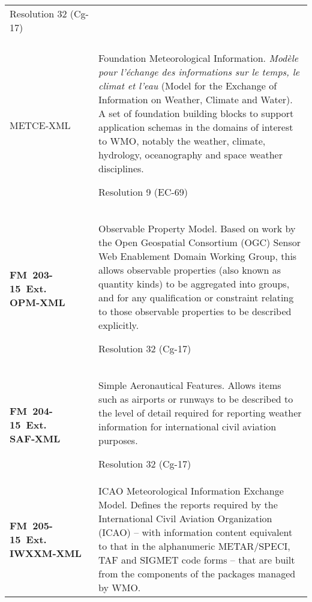 \begin{longtable}[]{@{}ll@{}}
\begin{minipage}[t]{0.47\columnwidth}
Resolution 32 (Cg-17)\strut
\end{minipage}\tabularnewline
\begin{minipage}[t]{0.47\columnwidth}\raggedright
\textbf{FM~202-16\\
METCE‑XML}\strut
\end{minipage} & \begin{minipage}[t]{0.47\columnwidth}\raggedright
Foundation Meteorological Information. \emph{Modèle pour l'échange des informations sur le temps, le climat et l'eau} (Model for the Exchange of Information on Weather, Climate and Water). A set of foundation building blocks to support application schemas in the domains of interest to WMO, notably the weather, climate, hydrology, oceanography and space weather disciplines.

Resolution 9 (EC-69)\strut
\end{minipage}\tabularnewline
\begin{minipage}[t]{0.47\columnwidth}\raggedright
\textbf{FM~203-15~Ext. OPM‑XML}\strut
\end{minipage} & \begin{minipage}[t]{0.47\columnwidth}\raggedright
Observable Property Model. Based on work by the Open Geospatial Consortium (OGC) Sensor Web Enablement Domain Working Group, this allows observable properties (also known as quantity kinds) to be aggregated into groups, and for any qualification or constraint relating to those observable properties to be described explicitly.

Resolution 32 (Cg-17)\strut
\end{minipage}\tabularnewline
\begin{minipage}[t]{0.47\columnwidth}\raggedright
\textbf{FM~204-15~Ext. SAF‑XML}\strut
\end{minipage} & \begin{minipage}[t]{0.47\columnwidth}\raggedright
Simple Aeronautical Features. Allows items such as airports or runways to be described to the level of detail required for reporting weather information for international civil aviation purposes.

Resolution 32 (Cg-17)\strut
\end{minipage}\tabularnewline
\begin{minipage}[t]{0.47\columnwidth}\raggedright
\textbf{FM~205-15~Ext. IWXXM‑XML}\strut
\end{minipage} & \begin{minipage}[t]{0.47\columnwidth}\raggedright
ICAO Meteorological Information Exchange Model. Defines the reports required by the International Civil Aviation Organization (ICAO) -- with information content equivalent to that in the alphanumeric METAR/SPECI, TAF and SIGMET code forms -- that are built from the components of the packages managed by WMO.


\end{minipage}
\end{longtable}
